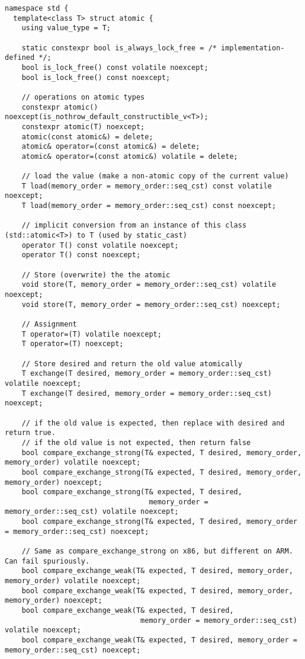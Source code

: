 \begin{verbatim}
namespace std {
  template<class T> struct atomic {
    using value_type = T;
  
    static constexpr bool is_always_lock_free = /* implementation-defined */;
    bool is_lock_free() const volatile noexcept;
    bool is_lock_free() const noexcept;
  
    // operations on atomic types
    constexpr atomic() noexcept(is_nothrow_default_constructible_v<T>);
    constexpr atomic(T) noexcept;
    atomic(const atomic&) = delete;
    atomic& operator=(const atomic&) = delete;
    atomic& operator=(const atomic&) volatile = delete;
  
    // load the value (make a non-atomic copy of the current value)
    T load(memory_order = memory_order::seq_cst) const volatile noexcept;
    T load(memory_order = memory_order::seq_cst) const noexcept;

    // implicit conversion from an instance of this class (std::atomic<T>) to T (used by static_cast)
    operator T() const volatile noexcept;
    operator T() const noexcept;

    // Store (overwrite) the the atomic
    void store(T, memory_order = memory_order::seq_cst) volatile noexcept;
    void store(T, memory_order = memory_order::seq_cst) noexcept;

    // Assignment 
    T operator=(T) volatile noexcept;
    T operator=(T) noexcept;
    
    // Store desired and return the old value atomically
    T exchange(T desired, memory_order = memory_order::seq_cst) volatile noexcept;
    T exchange(T desired, memory_order = memory_order::seq_cst) noexcept;

    // if the old value is expected, then replace with desired and return true.
    // if the old value is not expected, then return false
    bool compare_exchange_strong(T& expected, T desired, memory_order, memory_order) volatile noexcept;
    bool compare_exchange_strong(T& expected, T desired, memory_order, memory_order) noexcept;
    bool compare_exchange_strong(T& expected, T desired,
                                  memory_order = memory_order::seq_cst) volatile noexcept;
    bool compare_exchange_strong(T& expected, T desired, memory_order = memory_order::seq_cst) noexcept;

    // Same as compare_exchange_strong on x86, but different on ARM. Can fail spuriously.
    bool compare_exchange_weak(T& expected, T desired, memory_order, memory_order) volatile noexcept;
    bool compare_exchange_weak(T& expected, T desired, memory_order, memory_order) noexcept;
    bool compare_exchange_weak(T& expected, T desired,
                                memory_order = memory_order::seq_cst) volatile noexcept;
    bool compare_exchange_weak(T& expected, T desired, memory_order = memory_order::seq_cst) noexcept;
  

\end{verbatim}
